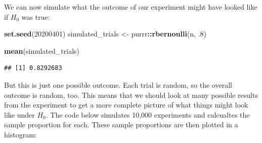 \documentclass[
]{book}
\newenvironment{Shaded}{\begin{snugshade}}{\end{snugshade}}
\newcommand{\ControlFlowTok}[1]{\textcolor[rgb]{0.13,0.29,0.53}{\textbf{#1}}}
\newcommand{\DataTypeTok}[1]{\textcolor[rgb]{0.13,0.29,0.53}{#1}}
\newcommand{\DecValTok}[1]{\textcolor[rgb]{0.00,0.00,0.81}{#1}}
\newcommand{\FloatTok}[1]{\textcolor[rgb]{0.00,0.00,0.81}{#1}}
\newcommand{\KeywordTok}[1]{\textcolor[rgb]{0.13,0.29,0.53}{\textbf{#1}}}
\newcommand{\NormalTok}[1]{#1}
\newcommand{\OperatorTok}[1]{\textcolor[rgb]{0.81,0.36,0.00}{\textbf{#1}}}
\newcommand{\StringTok}[1]{\textcolor[rgb]{0.31,0.60,0.02}{#1}}
\theoremstyle{definition}
\theoremstyle{definition}
\theoremstyle{definition}
\theoremstyle{remark}
\begin{document}
We can now simulate what the outcome of our experiment might have looked like if \(H_0\) was true:

\begin{Shaded}
\begin{Highlighting}[]
\KeywordTok{set.seed}\NormalTok{(}\DecValTok{20200401}\NormalTok{)}
\NormalTok{simulated_trials <-}\StringTok{ }\NormalTok{purrr}\OperatorTok{::}\KeywordTok{rbernoulli}\NormalTok{(n, }\FloatTok{.8}\NormalTok{)}

\KeywordTok{mean}\NormalTok{(simulated_trials)}
\end{Highlighting}
\end{Shaded}

\begin{verbatim}
## [1] 0.8292683
\end{verbatim}

But this is just one possible outcome. Each trial is random, so the overall outcome is random, too. This means that we should look at many possible results from the experiment to get a more complete picture of what things might look like under \(H_0\). The code below simulates 10,000 experiments and calcualtes the sample proportion for each. These sample proportions are then plotted in a histogram:

\begin{Shaded}
\end{Shaded}
\end{document}
